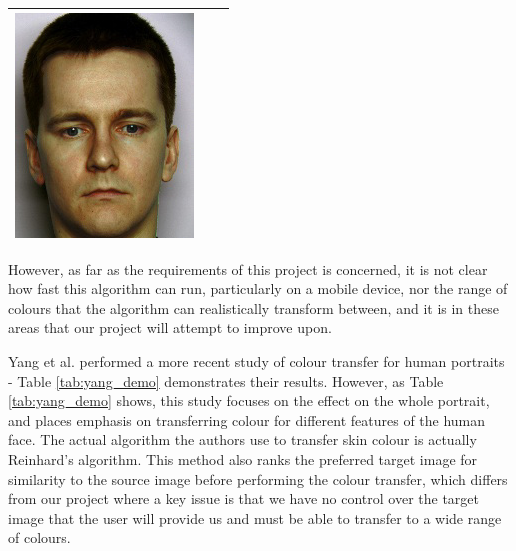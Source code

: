 \begin{table}[H]
\begin{tabular}{|c|c|c|}
\begin{minipage}{.29\textwidth}
    \includegraphics[width=\textwidth,height=\textheight,keepaspectratio]{images/seo_result1}
  \end{minipage} \\
    \hline
\end{tabular}
\end{table}

However, as far as the requirements of this project is concerned, it is not clear how fast this algorithm can run, particularly on a mobile device, nor the range of colours that the algorithm can realistically transform between, and it is in these areas that our project will attempt to improve upon.

Yang et al. performed a more recent study of colour transfer for human portraits \cite{yang_2017_semantic} - Table \ref{tab:yang_demo} demonstrates their results. However, as Table \ref{tab:yang_demo} shows, this study focuses on the effect on the whole portrait, and places emphasis on transferring colour for different features of the human face. The actual algorithm the authors use to transfer skin colour is actually Reinhard's algorithm. This method also ranks the preferred target image for similarity to the source image before performing the colour transfer, which differs from our project where a key issue is that we have no control over the target image that the user will provide us and must be able to transfer to a wide range of colours. 

